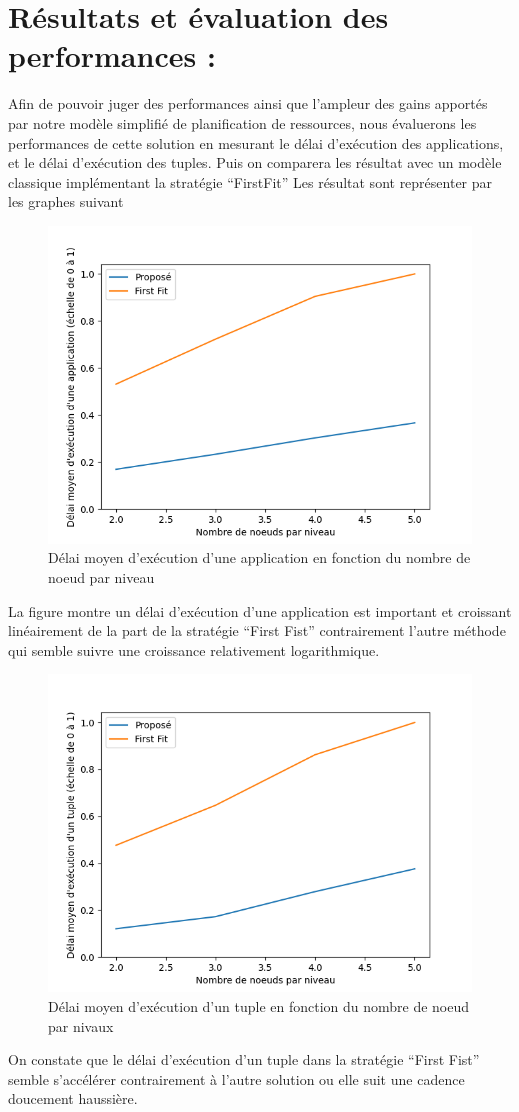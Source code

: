 \section{Résultats et évaluation des performances :}
Afin de pouvoir juger des performances ainsi que l’ampleur des gains apportés par notre modèle simplifié de planification de ressources,  nous évaluerons les performances de cette solution en mesurant le délai d'exécution des applications, et le délai d'exécution des tuples. Puis on comparera les résultat avec un modèle classique implémentant la stratégie “FirstFit”
Les résultat sont représenter par les graphes suivant
\begin{figure}[H]
    \centering
    \includegraphics[]{src/ressources/loopDelayPerLvl.png}
    \caption{Délai moyen d'exécution d’une application en fonction du nombre de noeud par niveau}
    \label{fig:}
\end{figure}
La figure montre un délai d'exécution d’une application est important et croissant linéairement de la part de la stratégie “First Fist” contrairement l’autre méthode qui semble suivre une croissance relativement logarithmique.
\begin{figure}[H]
    \centering
    \includegraphics[]{src/ressources/tupleDelayPerLvl.png}
    \caption{Délai moyen d'exécution d’un tuple en fonction du nombre de noeud par nivaux}
    \label{fig:}
\end{figure}
On constate que le délai d'exécution d’un tuple dans la stratégie “First Fist” semble s'accélérer contrairement à l'autre solution ou elle suit une cadence doucement haussière. 